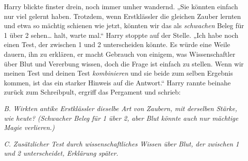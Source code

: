 Harry blickte finster drein, noch immer umher wandernd. „Sie könnten einfach nur viel gelernt haben. Trotzdem, wenn Erstklässler die gleichen Zauber lernten und etwa so mächtig schienen wie jetzt, könnten wir das als \emph{schwachen} Beleg für 1 über 2 sehen… halt, warte mal.“ Harry stoppte auf der Stelle. „Ich habe noch einen Test, der zwischen 1 und 2 unterscheiden könnte. Es würde eine Weile dauern, ihn zu erklären, er macht Gebrauch von einigem, was Wissenschaftler über Blut und Vererbung wissen, doch die Frage ist einfach zu stellen. Wenn wir meinen Test und deinen Test \emph{kombinieren} und sie beide zum selben Ergebnis kommen, ist das ein starker Hinweis auf die Antwort.“ Harry rannte beinahe zurück zum Schreibpult, ergriff das Pergament und schrieb:

\emph{B. Wirkten antike Erstklässler dieselbe Art von Zaubern, mit derselben Stärke, wie heute? (Schwacher Beleg für 1 über 2, aber Blut könnte auch nur mächtige Magie verlieren.)}

\emph{C. Zusätzlicher Test durch wissenschaftliches Wissen über Blut, der zwischen 1 und 2 unterscheidet, Erklärung später.}

